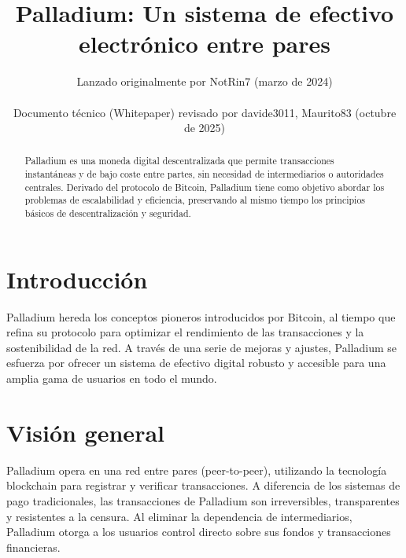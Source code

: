 \documentclass[11pt,a4paper]{article}
\title{\textbf{Palladium: Un sistema de efectivo electrónico entre pares}}
\author{Lanzado originalmente por NotRin7 (marzo de 2024) \\\\ Documento técnico (Whitepaper) revisado por davide3011, Maurito83 (octubre de 2025)}
\date{}
\begin{document}
\maketitle

\begin{abstract}
Palladium es una moneda digital descentralizada que permite transacciones instantáneas y de bajo coste entre partes, sin necesidad de intermediarios o autoridades centrales. Derivado del protocolo de Bitcoin, Palladium tiene como objetivo abordar los problemas de escalabilidad y eficiencia, preservando al mismo tiempo los principios básicos de descentralización y seguridad.
\end{abstract}

\section{Introducción}
Palladium hereda los conceptos pioneros introducidos por Bitcoin, al tiempo que refina su protocolo para optimizar el rendimiento de las transacciones y la sostenibilidad de la red. A través de una serie de mejoras y ajustes, Palladium se esfuerza por ofrecer un sistema de efectivo digital robusto y accesible para una amplia gama de usuarios en todo el mundo.

\section{Visión general}
Palladium opera en una red entre pares (peer-to-peer), utilizando la tecnología blockchain para registrar y verificar transacciones. A diferencia de los sistemas de pago tradicionales, las transacciones de Palladium son irreversibles, transparentes y resistentes a la censura. Al eliminar la dependencia de intermediarios, Palladium otorga a los usuarios control directo sobre sus fondos y transacciones financieras.
\end{document}
